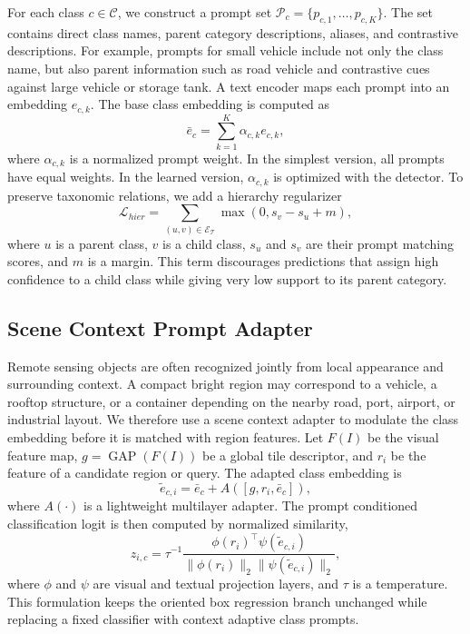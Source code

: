 \documentclass[10pt]{article}
\begin{document}
For each class $c \in \mathcal{C}$, we construct a prompt set $\mathcal{P}_c = \{p_{c,1}, \ldots, p_{c,K}\}$. The set contains direct class names, parent category descriptions, aliases, and contrastive descriptions. For example, prompts for small vehicle include not only the class name, but also parent information such as road vehicle and contrastive cues against large vehicle or storage tank. A text encoder maps each prompt into an embedding $e_{c,k}$. The base class embedding is computed as
\begin{equation}
    \bar{e}_c = \sum_{k=1}^{K} \alpha_{c,k} e_{c,k},
\end{equation}
where $\alpha_{c,k}$ is a normalized prompt weight. In the simplest version, all prompts have equal weights. In the learned version, $\alpha_{c,k}$ is optimized with the detector. To preserve taxonomic relations, we add a hierarchy regularizer
\begin{equation}
    \mathcal{L}_{hier}=\sum_{(u,v)\in \mathcal{E}_{\mathcal{T}}}
    \max(0, s_v - s_u + m),
\end{equation}
where $u$ is a parent class, $v$ is a child class, $s_u$ and $s_v$ are their prompt matching scores, and $m$ is a margin. This term discourages predictions that assign high confidence to a child class while giving very low support to its parent category.

\subsection{Scene Context Prompt Adapter}

Remote sensing objects are often recognized jointly from local appearance and surrounding context. A compact bright region may correspond to a vehicle, a rooftop structure, or a container depending on the nearby road, port, airport, or industrial layout. We therefore use a scene context adapter to modulate the class embedding before it is matched with region features. Let $F(I)$ be the visual feature map, $g=\operatorname{GAP}(F(I))$ be a global tile descriptor, and $r_i$ be the feature of a candidate region or query. The adapted class embedding is
\begin{equation}
    \tilde{e}_{c,i} = \bar{e}_{c} + A([g,r_i,\bar{e}_c]),
\end{equation}
where $A(\cdot)$ is a lightweight multilayer adapter. The prompt conditioned classification logit is then computed by normalized similarity,
\begin{equation}
    z_{i,c} = \tau^{-1}
    \frac{\phi(r_i)^\top \psi(\tilde{e}_{c,i})}
    {\|\phi(r_i)\|_2\|\psi(\tilde{e}_{c,i})\|_2},
\end{equation}
where $\phi$ and $\psi$ are visual and textual projection layers, and $\tau$ is a temperature. This formulation keeps the oriented box regression branch unchanged while replacing a fixed classifier with context adaptive class prompts.
\end{document}
